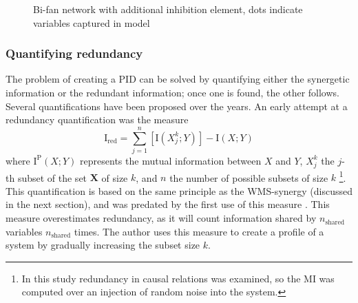 \documentclass[../main.tex]{subfiles}
\begin{document}
\begin{figure}[ht]
\begin{center}
\end{center}
\caption{Bi-fan network with additional inhibition element, dots indicate variables captured in model}
\label{bifan_syn}
\end{figure}

\subsubsection{Quantifying redundancy}

The problem of creating a PID can be solved by quantifying either the synergetic information or the redundant information; once one is found, the other follows.
Several quantifications have been proposed over the years.
An early attempt at a redundancy quantification was the measure
%
\begin{equation}
\mathrm{I}_\mathrm{red} = \sum_{j=1}^n [\mathrm{I}\left( X_j^k;Y \right) ] - \mathrm{I} \left( X;Y \right)
\end{equation}
%
where $\mathrm{I}^\mathrm{P}(X;Y)$ represents the mutual information between $X$ and $Y$, $X_j^k$ the $j$-th subset of the set $\mathbf{X}$ of size $k$, and $n$ the number of possible subsets of size $k$ \cite{tononi1999measures}\footnote{In this study redundancy in causal relations was examined, so the MI was computed over an injection of random noise into the system.}.
This quantification is based on the same principle as the WMS-synergy (discussed in the next section), and was predated by the first use of this measure \cite{gawne1993independent}.
This measure overestimates redundancy, as it will count information shared by $n_\mathrm{shared}$ variables $n_\mathrm{shared}$ times.
The author uses this measure to create a profile of a system by gradually increasing the subset size $k$.
\end{document}
